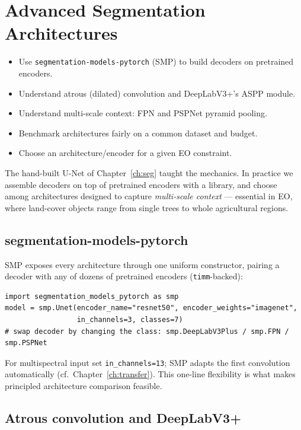 \chapter{Advanced Segmentation Architectures}
\label{ch:advseg}


\begin{objbox}
\begin{itemize}[leftmargin=1.2em,nosep]
  \item Use \texttt{segmentation-models-pytorch} (SMP) to build decoders on pretrained encoders.
  \item Understand atrous (dilated) convolution and DeepLabV3+'s ASPP module.
  \item Understand multi-scale context: FPN and PSPNet pyramid pooling.
  \item Benchmark architectures fairly on a common dataset and budget.
  \item Choose an architecture/encoder for a given EO constraint.
\end{itemize}
\end{objbox}

The hand-built U-Net of Chapter~\ref{ch:seg} taught the mechanics. In practice
we assemble decoders on top of pretrained encoders with a library, and choose
among architectures designed to capture \emph{multi-scale context} --- essential
in EO, where land-cover objects range from single trees to whole agricultural
regions.

\section{segmentation-models-pytorch}

SMP exposes every architecture through one uniform constructor, pairing a
decoder with any of dozens of pretrained encoders (\texttt{timm}-backed):
\begin{lstlisting}
import segmentation_models_pytorch as smp
model = smp.Unet(encoder_name="resnet50", encoder_weights="imagenet",
                 in_channels=3, classes=7)
# swap decoder by changing the class: smp.DeepLabV3Plus / smp.FPN / smp.PSPNet
\end{lstlisting}
For multispectral input set \texttt{in\_channels=13}; SMP adapts the first
convolution automatically (cf.\ Chapter~\ref{ch:transfer}). This one-line
flexibility is what makes principled architecture comparison feasible.

\section{Atrous convolution and DeepLabV3+}

